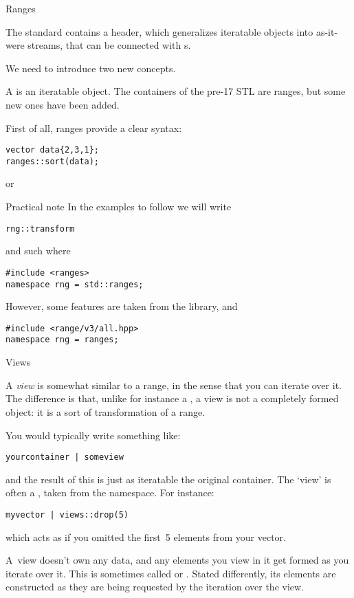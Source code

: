  {Ranges}
\label{sec:ranges}

The  standard contains a  header,
which generalizes iteratable objects into as-it-were streams,
that can be connected with s.

We need to introduce two new concepts.

A  is an iteratable object.
The containers of the pre-17 \ac{STL} are ranges, but
some new ones have been added.

First of all, ranges provide a clear syntax:
\begin{lstlisting}
vector data{2,3,1};
ranges::sort(data);
\end{lstlisting}
or

\begin{block}{Practical note}
  In the examples to follow we will write
\begin{lstlisting}
rng::transform
\end{lstlisting}
  and such where 
\begin{lstlisting}
#include <ranges>
namespace rng = std::ranges;
\end{lstlisting}
  However, some features are taken from the  library,
  and
\begin{lstlisting}
#include <range/v3/all.hpp>
namespace rng = ranges;
\end{lstlisting}
\end{block}

 {Views}

A \emph{view}
is somewhat similar to a range, in the sense that
you can iterate over it.
The difference is that, unlike for instance a ,
a view is not a completely formed object:
it is a sort of transformation of a range.

You would typically write something like:
\begin{lstlisting}
yourcontainer | someview
\end{lstlisting}
and the result of this is just as iteratable the original container.
The `view' is often a , taken
from the  namespace. For instance:
\begin{lstlisting}
myvector | views::drop(5)
\end{lstlisting}
which acts as if you omitted the first~5 elements from your vector.

A~view doesn't own any data, and any elements you view in it get formed
as you iterate over it.
This is sometimes called 
or .
Stated differently, its elements are constructed
as they are being requested by the iteration over the view.

